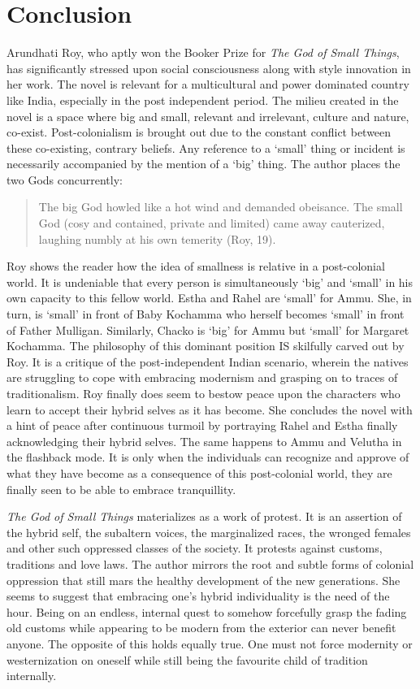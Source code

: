 \section{Conclusion}

Arundhati Roy, who aptly won the Booker Prize for \emph{The God of Small Things}, has significantly stressed upon social consciousness along with style innovation in her work. The novel is relevant for a multicultural and power dominated country like India, especially in the post independent period. The milieu created in the novel is a space where big and small, relevant and irrelevant, culture and nature, co-exist. Post-colonialism is brought out due to the constant conflict between these co-existing, contrary beliefs. Any reference to a ‘small’ thing or incident is necessarily accompanied by the mention of a ‘big’ thing. The author places the two Gods concurrently: 

\begin{quote}
  The big God howled like a hot wind and demanded obeisance. The small God (cosy and contained, private and limited) came away cauterized, laughing numbly at his own temerity (Roy, 19).
\end{quote}

Roy shows the reader how the idea of smallness is relative in a post-colonial world. It is undeniable that every person is simultaneously ‘big’ and ‘small’ in his own capacity to this fellow world. Estha and Rahel are ‘small’ for Ammu. She, in turn, is ‘small’ in front of Baby Kochamma who herself becomes ‘small’ in front of Father Mulligan. Similarly, Chacko is ‘big’ for Ammu but ‘small’ for Margaret Kochamma. The philosophy of this dominant position IS skilfully carved out by Roy. It is a critique of the post-independent Indian scenario, wherein the natives are struggling to cope with embracing modernism and grasping on to traces of traditionalism. Roy finally does seem to bestow peace upon the characters who learn to accept their hybrid selves as it has become. She concludes the novel with a hint of peace after continuous turmoil by portraying Rahel and Estha finally acknowledging their hybrid selves. The same happens to Ammu and Velutha in the flashback mode. It is only when the individuals can recognize and approve of what they have become as a consequence of this post-colonial world, they are finally seen to be able to embrace tranquillity.

\emph{The God of Small Things} materializes as a work of protest. It is an assertion of the hybrid self, the subaltern voices, the marginalized races, the wronged females and other such oppressed classes of the society. It protests against customs, traditions and love laws. The author mirrors the root and subtle forms of colonial oppression that still mars the healthy development of the new generations. She seems to suggest that embracing one’s hybrid individuality is the need of the hour. Being on an endless, internal quest to somehow forcefully grasp the fading old customs while appearing to be modern from the exterior can never benefit anyone. The opposite of this holds equally true. One must not force modernity or westernization on oneself while still being the favourite child of tradition internally. 

